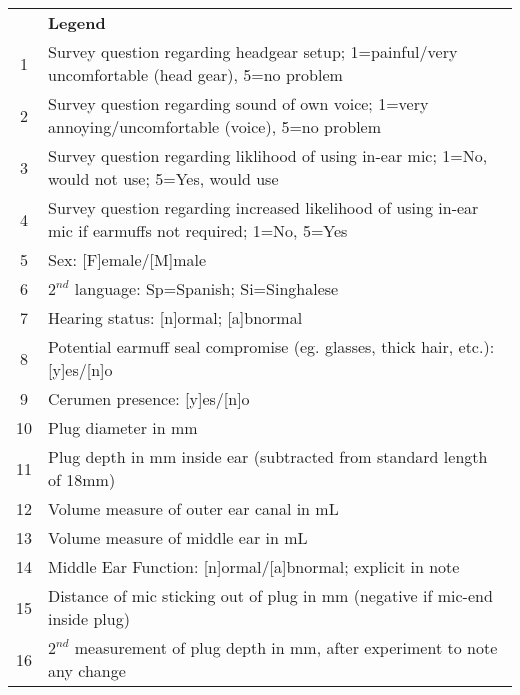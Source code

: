 \begin{table}
\begin{tabular}{c|p{13cm}}
  & \textbf{Legend} \\
1 & Survey question regarding headgear setup; 1=painful/very uncomfortable (head gear), 5=no problem \\
2 & Survey question regarding sound of own voice; 1=very annoying/uncomfortable (voice), 5=no problem \\
3 & Survey question regarding liklihood of using in-ear mic; 1=No, would not use; 5=Yes, would use \\
4 & Survey question regarding increased likelihood of using in-ear mic if earmuffs not required; 1=No, 5=Yes \\
5 & Sex: [F]emale/[M]male \\
6 & $2^{nd}$ language: Sp=Spanish; Si=Singhalese \\
7 & Hearing status: [n]ormal; [a]bnormal\\
8 & Potential earmuff seal compromise (eg. glasses, thick hair, etc.): [y]es/[n]o  \\
9 & Cerumen presence: [y]es/[n]o \\
10 & Plug diameter in mm \\
11 & Plug depth in mm inside ear (subtracted from standard length of 18mm)\\
12 & Volume measure of outer ear canal in mL \\
13 & Volume measure of middle ear in mL \\
14 & Middle Ear Function: [n]ormal/[a]bnormal; explicit in note \\
15 & Distance of mic sticking out of plug in mm (negative if mic-end inside plug) \\
16 & $2^{nd}$ measurement of plug depth in mm, after experiment to note any change \\
\end{tabular}
\caption{}\label{appAlegend}
\end{table}

